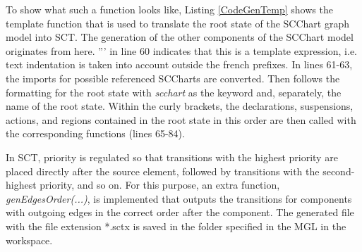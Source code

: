 To show what such a function looks like, Listing \ref{CodeGenTemp} shows the template function that is used to translate the root state of the SCChart graph model into SCT. The generation of the other components of the SCChart model originates from here. ''' in line 60 indicates that this is a template expression, i.e. text indentation is taken into account outside the french prefixes.  In lines 61-63, the imports for possible referenced SCCharts are converted. Then follows the formatting for the root state with \textit{scchart} as the keyword and, separately, the name of the root state. Within the curly brackets, the declarations, suspensions, actions, and regions contained in the root state in this order are then called with the corresponding functions (lines 65-84). 


In SCT, priority is regulated so that transitions with the highest priority are placed directly after the source element, followed by transitions with the second-highest priority, and so on. For this purpose, an extra function, \textit{genEdgesOrder(...)}, is implemented that outputs the transitions for components with outgoing edges in the correct order after the component. The generated file with the file extension *.sctx is saved in the folder specified in the MGL in the workspace. 


